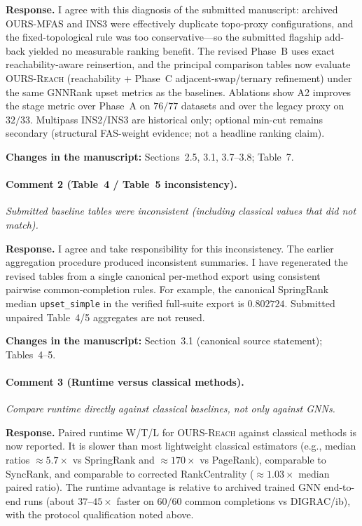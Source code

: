 \documentclass[11pt]{article}
\newcommand{\commentbox}[1]{\par\textit{#1}\par\medskip}
\newcommand{\changes}[1]{\textbf{Changes in the manuscript:} #1\par\medskip}
\begin{document}
\noindent\textbf{Response.}
I agree with this diagnosis of the submitted manuscript: archived \textsc{OURS-MFAS} and \textsc{INS3} were effectively duplicate topo-proxy configurations, and the fixed-topological rule was too conservative---so the submitted flagship add-back yielded no measurable ranking benefit. The revised Phase~B uses exact reachability-aware reinsertion, and the principal comparison tables now evaluate \textsc{OURS-Reach} (reachability + Phase~C adjacent-swap/ternary refinement) under the same GNNRank upset metrics as the baselines. Ablations show A2 improves the stage metric over Phase~A on $76/77$ datasets and over the legacy proxy on $32/33$. Multipass INS2/INS3 are historical only; optional min-cut remains secondary (structural FAS-weight evidence; not a headline ranking claim).

\changes{Sections~2.5, 3.1, 3.7--3.8; Table~7.}

\paragraph{Comment 2 (Table~4 / Table~5 inconsistency).}
\commentbox{Submitted baseline tables were inconsistent (including classical values that did not match).}

\noindent\textbf{Response.}
I agree and take responsibility for this inconsistency. The earlier aggregation procedure produced inconsistent summaries. I have regenerated the revised tables from a single canonical per-method export using consistent pairwise common-completion rules. For example, the canonical SpringRank median \texttt{upset\_simple} in the verified full-suite export is $0.802724$. Submitted unpaired Table~4/5 aggregates are not reused.

\changes{Section~3.1 (canonical source statement); Tables~4--5.}

\paragraph{Comment 3 (Runtime versus classical methods).}
\commentbox{Compare runtime directly against classical baselines, not only against GNNs.}

\noindent\textbf{Response.}
Paired runtime W/T/L for \textsc{OURS-Reach} against classical methods is now reported. It is slower than most lightweight classical estimators (e.g., median ratios $\approx 5.7\times$ vs SpringRank and $\approx 170\times$ vs PageRank), comparable to SyncRank, and comparable to corrected RankCentrality ($\approx 1.03\times$ median paired ratio). The runtime advantage is relative to archived trained GNN end-to-end runs (about $37$--$45\times$ faster on $60/60$ common completions vs DIGRAC/ib), with the protocol qualification noted above.
\end{document}

